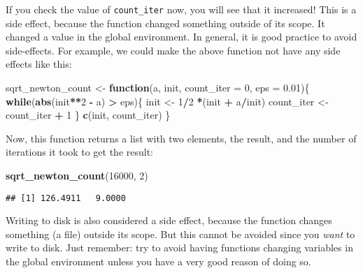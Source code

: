 \documentclass[
]{article}
\newenvironment{Shaded}{\begin{snugshade}}{\end{snugshade}}
\newcommand{\ControlFlowTok}[1]{\textcolor[rgb]{0.13,0.29,0.53}{\textbf{#1}}}
\newcommand{\DataTypeTok}[1]{\textcolor[rgb]{0.13,0.29,0.53}{#1}}
\newcommand{\DecValTok}[1]{\textcolor[rgb]{0.00,0.00,0.81}{#1}}
\newcommand{\FloatTok}[1]{\textcolor[rgb]{0.00,0.00,0.81}{#1}}
\newcommand{\KeywordTok}[1]{\textcolor[rgb]{0.13,0.29,0.53}{\textbf{#1}}}
\newcommand{\NormalTok}[1]{#1}
\newcommand{\OperatorTok}[1]{\textcolor[rgb]{0.81,0.36,0.00}{\textbf{#1}}}
\newcommand{\StringTok}[1]{\textcolor[rgb]{0.31,0.60,0.02}{#1}}
\begin{document}
If you check the value of \texttt{count\_iter} now, you will see that it increased! This is a side effect,
because the function changed something outside of its scope. It changed a value in the global
environment. In general, it is good practice to avoid side-effects. For example, we could make the
above function not have any side effects like this:

\begin{Shaded}
\begin{Highlighting}[]
\NormalTok{sqrt\_newton\_count \textless{}{-}}\StringTok{ }\ControlFlowTok{function}\NormalTok{(a, init, }\DataTypeTok{count\_iter =} \DecValTok{0}\NormalTok{, }\DataTypeTok{eps =} \FloatTok{0.01}\NormalTok{)\{}
    \ControlFlowTok{while}\NormalTok{(}\KeywordTok{abs}\NormalTok{(init}\OperatorTok{**}\DecValTok{2} \OperatorTok{{-}}\StringTok{ }\NormalTok{a) }\OperatorTok{\textgreater{}}\StringTok{ }\NormalTok{eps)\{}
\NormalTok{        init \textless{}{-}}\StringTok{ }\DecValTok{1}\OperatorTok{/}\DecValTok{2} \OperatorTok{*}\NormalTok{(init }\OperatorTok{+}\StringTok{ }\NormalTok{a}\OperatorTok{/}\NormalTok{init)}
\NormalTok{        count\_iter \textless{}{-}}\StringTok{ }\NormalTok{count\_iter }\OperatorTok{+}\StringTok{ }\DecValTok{1}
\NormalTok{    \}}
    \KeywordTok{c}\NormalTok{(init, count\_iter)}
\NormalTok{\}}
\end{Highlighting}
\end{Shaded}

Now, this function returns a list with two elements, the result, and the number of iterations it
took to get the result:

\begin{Shaded}
\begin{Highlighting}[]
\KeywordTok{sqrt\_newton\_count}\NormalTok{(}\DecValTok{16000}\NormalTok{, }\DecValTok{2}\NormalTok{)}
\end{Highlighting}
\end{Shaded}

\begin{verbatim}
## [1] 126.4911   9.0000
\end{verbatim}

Writing to disk is also considered a side effect, because the function changes something (a file)
outside its scope. But this cannot be avoided since you \emph{want} to write to disk.
Just remember: try to avoid having functions changing variables in the global environment unless
you have a very good reason of doing so.
\end{document}
